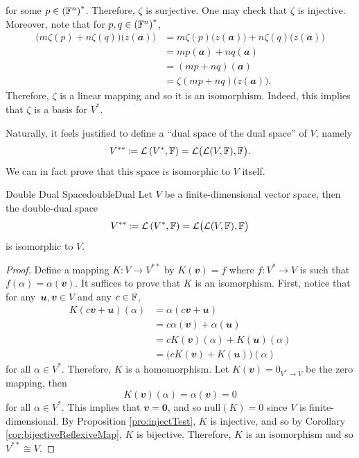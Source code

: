 \documentclass[math]{amznotes}
\theoremstyle{remark}
\newcommand{\zero}{\mathbf{0}}
\begin{document}
for some $p \in \left(\mathbb{F}^n\right)^*$. Therefore, $\zeta$ is surjective. One may check that $\zeta$ is injective. Moreover, note that for $p, q \in \left(\mathbb{F}^n\right)^*$,
\begin{align*}
    \bigl(m\zeta(p) + n\zeta(q)\bigr)\bigl(z(\mathbfit{a})\bigr) & = m\zeta(p)\bigl(z(\mathbfit{a})\bigr) + n\zeta(q)\bigl(z(\mathbfit{a})\bigr) \\
    & = mp(\mathbfit{a}) + nq(\mathbfit{a}) \\
    & = (mp + nq)(\mathbfit{a}) \\
    & = \zeta(mp + nq)\bigl(z(\mathbfit{a})\bigr).
\end{align*}
Therefore, $\zeta$ is a linear mapping and so it is an isomorphism. Indeed, this implies that $\zeta$ is a basis for $V^*$.

Naturally, it feels justified to define a ``dual space of the dual space'' of $V$, namely 
\begin{equation*}
    V^{**} \coloneqq \mathcal{L}\left(V^*, \mathbb{F}\right) = \mathcal{L}\bigl(\mathcal{L}(V, \mathbb{F}), \mathbb{F}\bigr).
\end{equation*}
We can in fact prove that this space is isomorphic to $V$ itself. 
\begin{probox}{Double Dual Space}{doubleDual}
    Let $V$ be a finite-dimensional vector space, then the double-dual space 
    \begin{equation*}
        V^{**} \coloneqq \mathcal{L}\left(V^*, \mathbb{F}\right) = \mathcal{L}\bigl(\mathcal{L}(V, \mathbb{F}), \mathbb{F}\bigr)
    \end{equation*}
    is isomorphic to $V$.
    \tcblower
    \begin{proof}
        Define a mapping $K \colon V \to V^{**}$ by $K(\mathbfit{v}) = f$ where $f \colon V^* \to V$ is such that~$f(\alpha) = \alpha(\mathbfit{v})$. It suffices to prove that $K$ is an isomorphism. First, notice that for any~$\mathbfit{u}, \mathbfit{v} \in V$ and any $c \in \mathbb{F}$,
        \begin{align*}
            K(c\mathbfit{v} + \mathbfit{u})(\alpha) & = \alpha(c\mathbfit{v} + \mathbfit{u}) \\
            & = c\alpha(\mathbfit{v}) + \alpha(\mathbfit{u}) \\
            & = cK(\mathbfit{v})(\alpha) + K(\mathbfit{u})(\alpha) \\
            & = \bigl(cK(\mathbfit{v}) + K(\mathbfit{u})\bigr)(\alpha)
        \end{align*}
        for all $\alpha \in V^*$. Therefore, $K$ is a homomorphism. Let $K(\mathbfit{v}) = 0_{V^* \to V}$ be the zero mapping, then 
        \begin{equation*}
            K(\mathbfit{v})(\alpha) = \alpha(\mathbfit{v}) = 0
        \end{equation*}
        for all $\alpha \in V^*$. This implies that $\mathbfit{v} = \zero$, and so $\mathrm{null}(K) = 0$ since $V$ is finite-dimensional. By Proposition \ref{pro:injectTest}, $K$ is injective, and so by Corollary \ref{cor:bijectiveReflexiveMap}, $K$ is bijective. Therefore, $K$ is an isomorphism and so $V^{**} \cong V$.
    \end{proof}
\end{probox}
\end{document}
